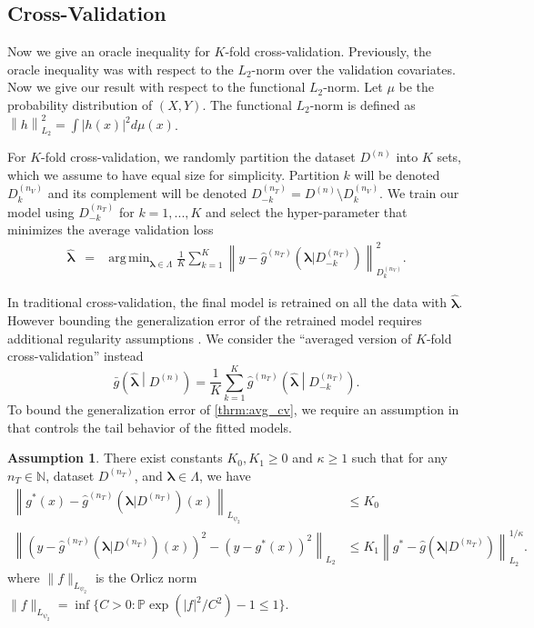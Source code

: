 \documentclass[12pt]{article} %
\theoremstyle{definition}
\newtheorem{assump}{Assumption}
\DeclareMathOperator*{\argmin}{arg\,min}
\begin{document}
\subsection{Cross-Validation}\label{sec:cv}

Now we give an oracle inequality for $K$-fold cross-validation.
Previously, the oracle inequality was with respect to the $L_2$-norm over the validation covariates.
Now we give our result with respect to the functional $L_2$-norm.
Let $\mu$ be the probability distribution of $(X,Y)$.
The functional $L_2$-norm is defined as
$
\left \| h \right \|^2_{L_2} = \int \left |h(x) \right |^2 d\mu(x)
$.

For $K$-fold cross-validation, we randomly partition the dataset $D^{(n)}$ into $K$ sets, which we assume to have equal size for simplicity. Partition $k$ will be denoted $D_k^{(n_V)}$ and its complement will be denoted $D_{-k}^{(n_T)} = D^{(n)} \setminus D_k^{(n_V)}$. We train our model using $D_{-k}^{(n_T)}$ for $k=1,...,K$ and select the hyper-parameter that minimizes the average validation loss
\begin{eqnarray}
\label{kfold_opt}
\hat{\boldsymbol \lambda} &=& \argmin_{\boldsymbol{\lambda} \in\Lambda} \frac{1}{K} \sum_{k=1}^K  \left \| y-\hat{g}^{(n_T)}(\boldsymbol \lambda | D_{-k}^{(n_T)}) \right \|_{D_k^{(n_V)}}^{2}.
\end{eqnarray}

In traditional cross-validation, the final model is retrained on all the data with $\hat{\boldsymbol{\lambda}}$. However bounding the generalization error of the retrained model requires additional regularity assumptions \citep{lecue2012oracle}. We consider the ``averaged version of $K$-fold cross-validation'' instead
\begin{equation}
\label{thrm:avg_cv}
\bar{g}\left ( \hat{\boldsymbol \lambda} \middle | {D^{(n)}} \right ) = 
\frac{1}{K} \sum_{k=1}^K 
\hat{g}^{(n_T)} \left (\hat{\boldsymbol \lambda} \middle | D^{(n_T)}_{-k} \right ).
\end{equation}
To bound the generalization error of \eqref{thrm:avg_cv}, we require an assumption in \citet{lecue2012oracle} that controls the tail behavior of the fitted models.
\begin{assump}
	\label{assump:tail_margin}
	There exist constants $K_0, K_1 \ge 0$ and $\kappa \ge 1$ such that for any $n_T \in \mathbb{N}$, dataset $D^{(n_T)}$, and $\boldsymbol{\lambda} \in \Lambda$, we have
	\begin{align}
	\left \|
	g^* (x) - \hat{g}^{(n_T)}(\boldsymbol{\lambda} | D^{(n_T)})(x)
	\right \|_{L_{\psi_2}} & \le K_0
	\label{eq:cv_assump1}\\
	\left \|
	\left(
	y - \hat{g}^{(n_T)}(\boldsymbol{\lambda} | D^{(n_T)})(x)
	\right)^2
	- \left(
	y - g^*(x)
	\right)^2
	\right \|_{L_2}
	& \le 
	K_1 \left \|
	g^{*}-\hat{g}(\boldsymbol{\lambda}|D^{(n_{T})})
	\right \|_{L_{2}}^{1/\kappa}.
	\label{eq:cv_assump2}
	\end{align}
	where $\|f\|_{L_{\psi_2}}$ is the Orlicz norm
	$\|f\|_{L_{\psi_2}} = \inf \{C > 0: \mathbb{P}\exp(|f|^2/C^2) - 1 \le 1\}$.
\end{assump}
\end{document}
